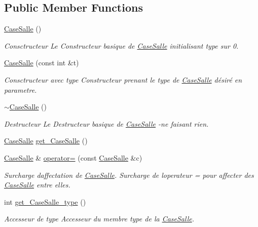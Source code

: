\subsection*{Public Member Functions}
\begin{DoxyCompactItemize}
\item 
\hyperlink{classCaseSalle_a4252822534722fccb7d8355f79d7f244}{Case\+Salle} ()
\begin{DoxyCompactList}\small\item\em Consctructeur Le Constructeur basique de \hyperlink{classCaseSalle}{Case\+Salle} initialisant type sur 0. \end{DoxyCompactList}\item 
\hyperlink{classCaseSalle_a470fc8fdb01879fd5405392909775fe6}{Case\+Salle} (const int \&t)
\begin{DoxyCompactList}\small\item\em Consctructeur avec type Constructeur prenant le type de \hyperlink{classCaseSalle}{Case\+Salle} désiré en parametre. \end{DoxyCompactList}\item 
\hyperlink{classCaseSalle_aca43a910dbbb59bdac7af10faa5b3f39}{$\sim$\+Case\+Salle} ()
\begin{DoxyCompactList}\small\item\em Destructeur Le Destructeur basique de \hyperlink{classCaseSalle}{Case\+Salle} -\/ne faisant rien. \end{DoxyCompactList}\item 
\hyperlink{classCaseSalle}{Case\+Salle} \hyperlink{classCaseSalle_a7b85096b9782b5d52089651c69f92bee}{get\+\_\+\+Case\+Salle} ()
\item 
\hyperlink{classCaseSalle}{Case\+Salle} \& \hyperlink{classCaseSalle_a8494bda87f21c608d7da7bb510c0e525}{operator=} (const \hyperlink{classCaseSalle}{Case\+Salle} \&c)
\begin{DoxyCompactList}\small\item\em Surcharge d\textquotesingle{}affectation de \hyperlink{classCaseSalle}{Case\+Salle}. Surcharge de l\textquotesingle{}operateur = pour affecter des \hyperlink{classCaseSalle}{Case\+Salle} entre elles. \end{DoxyCompactList}\item 
int \hyperlink{classCaseSalle_a0a2939d0c9c02c9ed643e040f8f9bfce}{get\+\_\+\+Case\+Salle\+\_\+type} ()
\begin{DoxyCompactList}\small\item\em Accesseur de {\itshape type} Accesseur du membre {\itshape type} de la \hyperlink{classCaseSalle}{Case\+Salle}. \end{DoxyCompactList}\item 

\end{DoxyCompactItemize}
